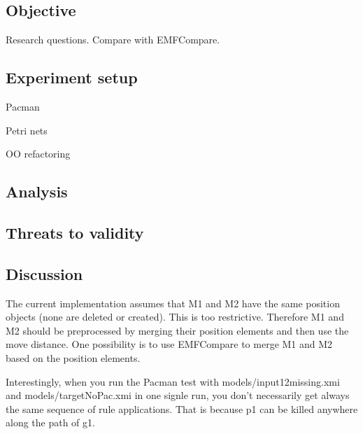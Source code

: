 \subsection{Objective}
Research questions.
Compare with EMFCompare.

\subsection{Experiment setup}

Pacman

Petri nets

OO refactoring

\subsection{Analysis}

\subsection{Threats to validity}

\subsection{Discussion}
The current implementation assumes that M1 and M2 have the same position objects (none are deleted or created). This is too restrictive. Therefore M1 and M2 should be preprocessed by merging their position elements and then use the move distance. One possibility is to use EMFCompare to merge M1 and M2 based on the position elements.

Interestingly, when you run the Pacman test with models/input12missing.xmi and models/targetNoPac.xmi in one signle run, you don't necessarily get always the same sequence of rule applications. That is because p1 can be killed anywhere along the path of g1.